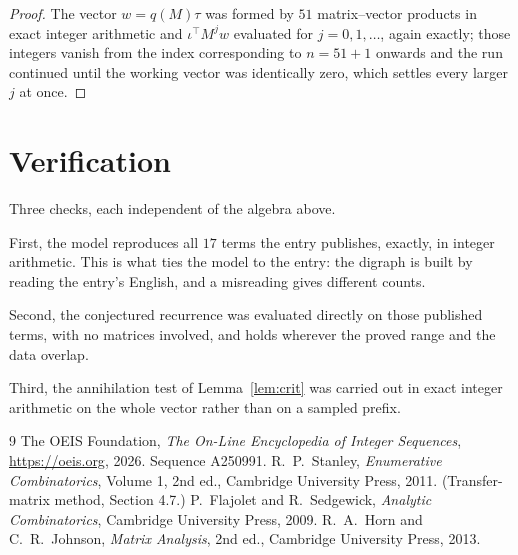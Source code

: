 \documentclass[11pt,a4paper]{article}
\theoremstyle{plain}
\theoremstyle{definition}
\begin{document}
\begin{proof}
The vector $w=q(M)\tau$ was formed by $51$ matrix--vector products in exact integer
arithmetic and $\iota^{\!\top}M^{j}w$ evaluated for $j=0,1,\dots$, again exactly; those
integers vanish from the index corresponding to $n=51+1$ onwards and the run continued
until the working vector was identically zero, which settles every larger $j$ at once.
\end{proof}

\section{Verification}

Three checks, each independent of the algebra above.

First, the model reproduces all $17$ terms the entry publishes, exactly, in integer
arithmetic. This is what ties the model to the entry: the digraph is built by reading the
entry's English, and a misreading gives different counts.

Second, the conjectured recurrence was evaluated directly on those published terms, with no
matrices involved, and holds wherever the proved range and the data overlap.

Third, the annihilation test of Lemma~\ref{lem:crit} was carried out in exact integer
arithmetic on the whole vector rather than on a sampled prefix.

\begin{thebibliography}{9}
 The OEIS Foundation, \emph{The On-Line Encyclopedia of Integer
Sequences}, \url{https://oeis.org}, 2026. Sequence A250991.
 R.~P.~Stanley, \emph{Enumerative Combinatorics}, Volume 1, 2nd ed.,
Cambridge University Press, 2011. (Transfer-matrix method, Section 4.7.)
 P.~Flajolet and R.~Sedgewick, \emph{Analytic Combinatorics}, Cambridge
University Press, 2009.
 R.~A.~Horn and C.~R.~Johnson, \emph{Matrix Analysis}, 2nd ed., Cambridge
University Press, 2013.
\end{thebibliography}
\end{document}
